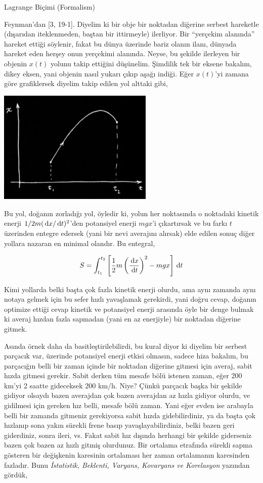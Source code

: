 \documentclass[12pt,fleqn]{article}\usepackage{../../common}
\begin{document}
Lagrange Biçimi (Formalism)

Feynman'dan [3, 19-1].  Diyelim ki bir obje bir noktadan diğerine serbest
hareketle (dışarıdan iteklenmeden, baştan bir ittirmeyle) ilerliyor. Bir
``yerçekim alanında'' hareket ettiği söylenir, fakat bu dünya üzerinde
bariz olanın ilanı, dünyada hareket eden herşey onun yerçekimi
alanında. Neyse, bu şekilde ilerleyen bir objenin $x(t)$ yolunu takip
ettiğini düşünelim. Şimdilik tek bir eksene bakalım, dikey eksen, yani
objenin nasıl yukarı çıkıp aşağı indiği. Eğer $x(t)$'yi zamana göre
grafiklersek diyelim takip edilen yol alttaki gibi,

\includegraphics[width=20em]{phy_lagrange_04.png}

Bu yol, doğanın zorladığı yol, öyledir ki, yolun her noktasında o noktadaki
kinetik enerji $1/2 m(\,\mathrm{d} x/\,\mathrm{d} t)^2$'den potansiyel enerji $mgx$'i
çıkartırsak ve bu farkı $t$ üzerinden entegre edersek (yani bir nevi
averajını alırsak) elde edilen sonuç diğer yollara nazaran en minimal
olandır. Bu entegral,

$$ 
S = \int_{t_1}^{t_2} 
\left[ 
\frac{1}{2} m \left( \frac{\,\mathrm{d} x}{\,\mathrm{d} t} \right)^2 - mgx 
\right] \,\mathrm{d} t
$$

Kimi yollarda belki başta çok fazla kinetik enerji olurdu, ama aynı zamanda
aynı notaya gelmek için bu sefer hızlı yavaşlamak gerekirdi, yani doğru
cevap, doğanın optimize ettiği cevap kinetik ve potansiyel enerji arasında
öyle bir denge bulmak ki averaj hızdan fazla sapmadan (yani en az
enerjiyle) bir noktadan diğerine gitmek. 

Asında örnek daha da basitleştirilebilirdi, bu kural diyor ki diyelim bir
serbest parçacık var, üzerinde potansiyel enerji etkisi olmasın, sadece
hiza bakalım, bu parçacığın belli bir zaman içinde bir noktadan diğerine
gitmesi için averaj, sabit hızda gitmesi gerekir. Sabit derken tüm mesafe
bölü istenen zaman, eğer 200 km'yi 2 saatte gideceksek 200 km/h. Niye?
Çünkü parçacık başka bir şekilde gidiyor olsaydı bazen averajdan çok bazen
averajdan az hızla gidiyor olurdu, ve gidilmesi için gereken hız belli,
mesafe bölü zaman. Yani eğer evden ise arabayla belli bir zamanda gitmeniz
gerekiyorsa sabit hızda gidebilirdiniz, ya da başta çok hızlanıp sona yakın
sürekli frene basıp yavaşlayabilirdiniz, belki bazen geri giderdiniz, sonra
ileri, vs. Fakat sabit hız dışında herhangi bir şekilde giderseniz bazen
çok bazen az hızlı gitmiş olurdunuz. Bir ortalama etrafında sürekli sapma
gösteren bir değişkenin karesinin ortalaması her zaman ortalamanın
karesinden fazladır. Bunu {\em İstatistik, Beklenti, Varyans, Kovaryans ve
  Korelasyon} yazından gördük,
\end{document}
